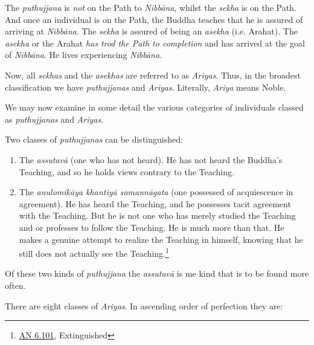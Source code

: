 The \textit{puthujjana} is \emph{not} on the Path to \textit{Nibbāna}, whilst the \textit{sekha} is on the Path. And once an individual is on the Path, the Buddha teaches that he is assured of arriving at \textit{Nibbāna}. The \textit{sekha} is assured of being an \textit{asekha} (i.e. Arahat). The \textit{asekha} or the Arahat \emph{has trod the Path to completion} and has arrived at the goal of \textit{Nibbāna}. He lives experiencing \textit{Nibbāna}.

Now, all \textit{sekhas} and the \textit{asekhas} are referred to as \textit{Ariyas}. Thus, in the broadest classification we have \textit{puthujjanas} and \textit{Ariyas}. Literally, \textit{Ariya} means Noble.

We may now examine in some detail the various categories of individuals classed as \textit{puthujjanas} and \textit{Ariyas}.

Two classes of \textit{puthujjanas} can be distinguished:

\begin{enumerate}
\def\labelenumi{\arabic{enumi}.}
\item
  The \textit{assutavā} (one who has not heard). He has not heard the Buddha's Teaching, and so he holds views contrary to the Teaching.
\item
  The \textit{anulomikāya khantiyā samannāgata} (one possessed of acquiescence in agreement). He has heard the Teaching, and he possesses tacit agreement with the Teaching. But he is not one who has merely studied the Teaching and or professes to follow the Teaching. He is much more than that. He makes a genuine attempt to realize the Teaching in himself, knowing that he still does not actually see the Teaching.\footnote{\href{https://suttacentral.net/an6.101/en/sujato}{AN 6.101}, Extinguished}
\end{enumerate}

Of these two kinds of \textit{puthujjana} the \textit{assutavā} is me kind that is to be found more often.

There are eight classes of \textit{Ariyas}. In ascending order of perfection they are:

